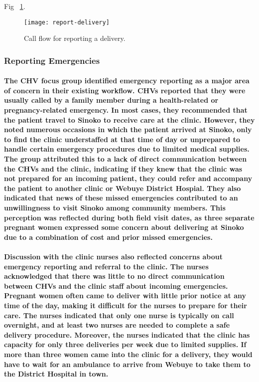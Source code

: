 Fig ~\ref{fig:delivery}.
\begin{figure}[]
	\begin{center}
	\texttt{[image: report-delivery]}
	\end{center}
	\caption{Call flow for reporting a delivery.}
	\label{fig:delivery}
\end{figure}

\subsubsection{Reporting Emergencies}
\paragraph{The CHV focus group identified emergency reporting as a major area of concern in their existing workflow. CHVs reported that they were usually called by a family member during a health-related or pregnancy-related emergency. In most cases, they recommended that the patient travel to Sinoko to receive care at the clinic. However, they noted numerous occasions in which the patient arrived at Sinoko, only to find the clinic understaffed at that time of day or unprepared to handle certain emergency procedures due to limited medical supplies. The group attributed this to a lack of direct communication between the CHVs and the clinic, indicating if they knew that the clinic was not prepared for an incoming patient, they could refer and accompany the patient to another clinic or Webuye District Hospial. They also indicated that news of these missed emergencies contributed to an unwillingness to visit Sinoko among community members. This perception was reflected during both field visit dates, as three separate pregnant women expressed some concern about delivering at Sinoko due to a combination of cost and prior missed emergencies.}

\paragraph{Discussion with the clinic nurses also reflected concerns about emergency reporting and referral to the clinic. The nurses acknowledged that there was little to no direct communication between CHVs and the clinic staff about incoming emergencies. Pregnant women often came to deliver with little prior notice at any time of the day, making it difficult for the nurses to prepare for their care. The nurses indicated that only one nurse is typically on call overnight, and at least two nurses are needed to complete a safe delivery procedure. Moreover, the nurses indicated that the clinic has capacity for only three deliveries per week due to limited supplies. If more than three women came into the clinic for a delivery, they would have to wait for an ambulance to arrive from Webuye to take them to the District Hospital in town.}

